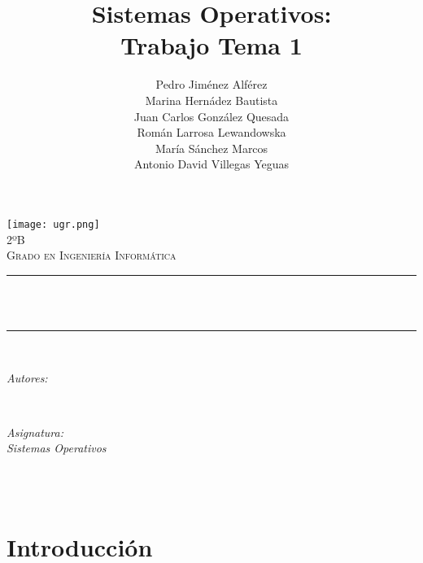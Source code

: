 \documentclass[12pt, spanish]{article}
\title{Sistemas Operativos:\\
Trabajo Tema 1  \hspace{0.05cm} }
\author{Pedro Jiménez Alférez \\
Marina Hernádez Bautista  \\
Juan Carlos González Quesada \\
Román Larrosa Lewandowska \\
María Sánchez Marcos \\
Antonio David Villegas Yeguas	}
\makeatletter
\let\thetitle\@title
\let\theauthor\@author
\let\thedate\@date
\makeatother
\begin{document}

\begin{titlepage}
    \centering
    \vspace*{0.5 cm}
    \texttt{[image: ugr.png]}\\[1.0 cm]
    \textsc{\large 2ºB}\\[0.5 cm]            
    \textsc{\large Grado en Ingeniería Informática}\\[0.5 cm]              
    \rule{\linewidth}{0.2 mm} \\[0.4 cm]
    { \huge \bfseries \thetitle}\\
    \rule{\linewidth}{0.2 mm} \\[1.5 cm]
    
    \begin{minipage}{0.4\textwidth}
        \begin{flushleft} \large
            \emph{Autores:}\\
            
            \small \theauthor
            \end{flushleft}
            \end{minipage}~
            \begin{minipage}{0.4\textwidth}
            \begin{flushright} \large
            \emph{Asignatura: \\
            Sistemas Operativos}                   
        \end{flushright}
    \end{minipage}\\[1 cm]
  	
    {\small \thedate}\\[1 cm]
 	
    \vfill
    
\end{titlepage}

\newpage



\tableofcontents
\pagebreak


\section{Introducción}
\end{document}
